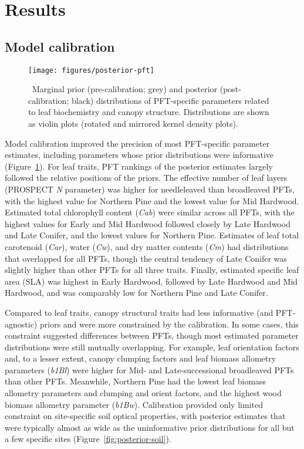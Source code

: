 \section{Results}

\subsection{Model calibration}

\begin{figure}
  \centering
  \texttt{[image: figures/posterior-pft]}
  \caption{\label{fig:posterior-pft}\
    Marginal prior (pre-calibration; grey) and posterior (post-calibration; black) distributions of PFT-specific parameters
    related to leaf biochemistry and canopy structure.
    Distributions are shown as violin plots (rotated and mirrored kernel density plots).
  }
\end{figure}

Model calibration improved the precision of most PFT-specific parameter estimates, including parameters whose prior distributions were informative (Figure~\ref{fig:posterior-pft}).
For leaf traits, PFT rankings of the posterior estimates largely followed the relative positions of the priors.
The effective number of leaf layers (PROSPECT \emph{N} parameter) was higher for needleleaved than broadleaved PFTs, with the highest value for Northern Pine and the lowest value for Mid Hardwood.
Estimated total chlorophyll content (\emph{Cab}) were similar across all PFTs, with the highest values for Early and Mid Hardwood followed closely by Late Hardwood and Late Conifer, and the lowest values for Northern Pine.
Estimates of leaf total carotenoid (\emph{Car}), water (\emph{Cw}), and dry matter contents (\emph{Cm}) had distributions that overlapped for all PFTs, though the central tendency of Late Conifer was slightly higher than other PFTs for all three traits.
Finally, estimated specific leaf area (SLA) was highest in Early Hardwood, followed by Late Hardwood and Mid Hardwood, and was comparably low for Northern Pine and Late Conifer.

Compared to leaf traits, canopy structural traits had less informative (and PFT-agnostic) priors and were more constrained by the calibration.
In some cases, this constraint suggested differences between PFTs, though most estimated parameter distributions were still mutually overlapping.
For example, leaf orientation factors and, to a lesser extent, canopy clumping factors and leaf biomass allometry parameters (\emph{b1Bl}) were higher for Mid- and Late-successional broadleaved PFTs than other PFTs.
Meanwhile, Northern Pine had the lowest leaf biomass allometry parameters and clumping and orient factors, and the highest wood biomass allometry parameter (\emph{b1Bw}).
Calibration provided only limited constraint on site-specific soil optical properties, with posterior estimates that were typically almost as wide as the uninformative prior distributions for all but a few specific sites (Figure~\ref{fig:posterior-soil}).

